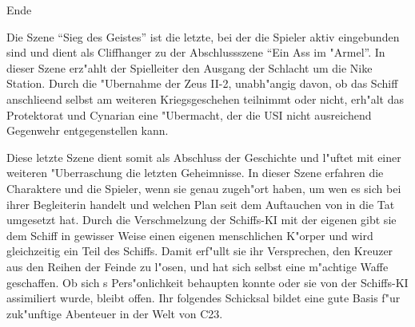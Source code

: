 \begin{remarks}
	\begin{center}\huge{}Ende\end{center}

	Die Szene ``Sieg des Geistes'' ist die letzte, bei der die Spieler aktiv eingebunden sind und dient als Cliffhanger zu der Abschlussszene ``Ein Ass im "Armel''. In dieser Szene erz"ahlt der Spielleiter den Ausgang der Schlacht um die Nike Station. Durch die "Ubernahme der Zeus II-2, unabh"angig davon, ob das Schiff anschlie\3end selbst am weiteren Kriegsgeschehen teilnimmt oder nicht, erh"alt das Protektorat und Cynarian eine "Ubermacht, der die USI nicht ausreichend Gegenwehr entgegenstellen kann.

	Diese letzte Szene dient somit als Abschluss der Geschichte und l"uftet mit einer weiteren "Uberraschung die letzten Geheimnisse. In dieser Szene erfahren die Charaktere und die Spieler, wenn sie genau zugeh"ort haben, um wen es sich bei ihrer Begleiterin handelt und welchen Plan \xl{} seit dem Auftauchen von \ml{} in die Tat umgesetzt hat. Durch die Verschmelzung der Schiffs-KI mit der eigenen gibt sie dem Schiff in gewisser Weise einen eigenen menschlichen K"orper und wird gleichzeitig ein Teil des Schiffs. Damit erf"ullt sie ihr Versprechen, den Kreuzer aus den Reihen der Feinde zu l"osen, und hat sich selbst eine m"achtige Waffe geschaffen. Ob sich \xl{}s Pers"onlichkeit behaupten konnte oder sie von der Schiffs-KI assimiliert wurde, bleibt offen. Ihr folgendes Schicksal bildet eine gute Basis f"ur zuk"unftige Abenteuer in der Welt von C23.
\end{remarks}
\vfill\pagebreak
